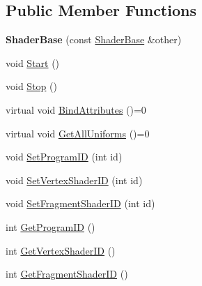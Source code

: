 \subsection*{Public Member Functions}
\begin{DoxyCompactItemize}
\item 
\mbox{\label{class_shaders_1_1_shader_base_a7cc6a08ac2589b24f7667f27b29622df}} 
{\bfseries Shader\+Base} (const \hyperlink{class_shaders_1_1_shader_base}{Shader\+Base} \&other)
\item 
void \hyperlink{class_shaders_1_1_shader_base_a70efd0722655ec3dd0c2de014a04fd17}{Start} ()
\item 
void \hyperlink{class_shaders_1_1_shader_base_a1d5f73624ff4f59633b159fd0772e84c}{Stop} ()
\item 
virtual void \hyperlink{class_shaders_1_1_shader_base_a8230f19d72ac58be9db263bbf8436967}{Bind\+Attributes} ()=0
\item 
virtual void \hyperlink{class_shaders_1_1_shader_base_ade949aa1626fbddd264a51b1dbb9a7cc}{Get\+All\+Uniforms} ()=0
\item 
void \hyperlink{class_shaders_1_1_shader_base_a25f6a1f85f7f3094f6019971239ad2ce}{Set\+Program\+ID} (int id)
\item 
void \hyperlink{class_shaders_1_1_shader_base_afb186a683a560e325c3e5fe6f60d6c59}{Set\+Vertex\+Shader\+ID} (int id)
\item 
void \hyperlink{class_shaders_1_1_shader_base_a984b4efce8e3dbb75302017c4f92bb3c}{Set\+Fragment\+Shader\+ID} (int id)
\item 
int \hyperlink{class_shaders_1_1_shader_base_a77870f40caecabf2acbae1eafd38f4c5}{Get\+Program\+ID} ()
\item 
int \hyperlink{class_shaders_1_1_shader_base_afb5d93c464cf2f726557bd4ff43d90ef}{Get\+Vertex\+Shader\+ID} ()
\item 
int \hyperlink{class_shaders_1_1_shader_base_a4cc693649848978b8496359eec993a31}{Get\+Fragment\+Shader\+ID} ()
\end{DoxyCompactItemize}
